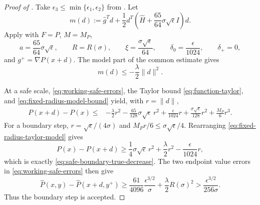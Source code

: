 \documentclass{article}
\begin{document}
\begin{proof}[Proof of ]
Take $\epsilon_3\le\min\{\epsilon_1,\epsilon_2\}$ from
.
Let
\[
 m(d):=\widehat g^Td+\frac12d^T
 \left(\widehat H+\frac{65}{64}\sigma\sqrt\epsilon I\right)d.
\]
Apply  with $F=P$, $M=M_P$,
\[
 a=\frac{65}{64}\sigma\sqrt\epsilon,\qquad
 R=R(\sigma),\qquad
 \xi=\frac{\sigma\sqrt\epsilon}{64},\qquad
 \delta_0=\frac{\epsilon}{1024},\qquad
 \delta_+=0,
\]
and $g^+=\nabla P(x+d)$.  The model part of the common estimate gives
\begin{equation}\label{eq:fixed-radius-model-bound}
 m(d)\le-\frac\lambda2\|d\|^2.
\end{equation}

At a safe scale, \eqref{eq:working-safe-errors}, the Taylor bound
\eqref{eq:function-taylor}, and
\eqref{eq:fixed-radius-model-bound} yield, with $r=\|d\|$,
\begin{equation}\label{eq:fixed-radius-taylor-model}
\begin{aligned}
 P(x+d)-P(x)
 \le{}&-\frac\lambda2r^2
 -\frac{65}{128}\sigma\sqrt\epsilon\,r^2
 +\frac{\epsilon}{1024}r
 +\frac{\sigma\sqrt\epsilon}{128}r^2
 +\frac{M_P}{6}r^3.
\end{aligned}
\end{equation}
For a boundary step, $r=\sqrt\epsilon/(4\sigma)$ and
$M_P r/6\le\sigma\sqrt\epsilon/4$.  Rearranging
\eqref{eq:fixed-radius-taylor-model} gives
\[
 P(x)-P(x+d)
 \ge\frac14\sigma\sqrt\epsilon\,r^2
     +\frac\lambda2r^2-\frac{\epsilon}{1024}r,
\]
which is exactly \eqref{eq:safe-boundary-true-decrease}.  The two
endpoint value errors in \eqref{eq:working-safe-errors} then give
\begin{equation}\label{eq:safe-boundary-proxy-decrease}
 \widehat P(x,y)-\widehat P(x+d,y^+)
 \ge\frac{61}{4096}\frac{\epsilon^{3/2}}{\sigma}
     +\frac\lambda2R(\sigma)^2
 >\frac{\epsilon^{3/2}}{256\sigma}.
\end{equation}
Thus the boundary step is accepted.


\end{proof}
\end{document}

